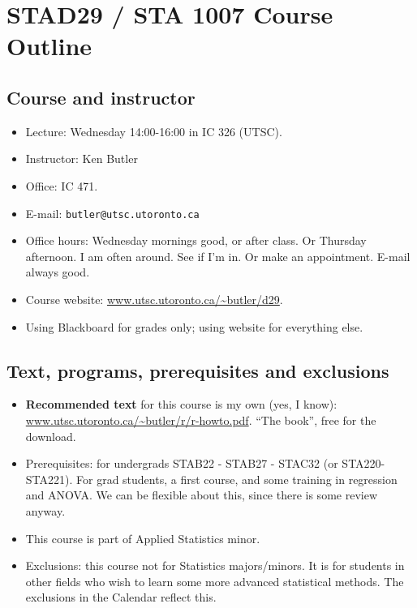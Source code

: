 \documentclass{article}
\begin{document}
\section*{STAD29 / STA 1007 Course Outline}

\subsection*{Course and instructor}
\begin{itemize}
    \item  Lecture: Wednesday 14:00-16:00 in IC 326 (UTSC).
    \item  Instructor: Ken Butler
    \item  Office: IC 471.
    \item  E-mail: \verb-butler@utsc.utoronto.ca-
    \item Office hours: Wednesday mornings good, or after
      class. Or Thursday afternoon. I am often around. See if I'm in. Or make an
      appointment. E-mail always good.
    \item Course website: 
\url{www.utsc.utoronto.ca/~butler/d29}.
    \item Using Blackboard for grades only; using website for
      everything else.
\end{itemize}



\subsection*{Text, programs, prerequisites and exclusions}

\begin{itemize}
    \item {\bf Recommended text} for this course is my own (yes, I
      know):
      \url{www.utsc.utoronto.ca/~butler/r/r-howto.pdf}.
      ``The book'', free for the download.

    \item Prerequisites: for undergrads STAB22 - STAB27 - STAC32
      (or STA220-STA221). For grad students,
      a first course, and some training in
      regression and ANOVA. We can be flexible about this, since there
      is some review anyway.
    \item This course is part of Applied Statistics minor.
    \item Exclusions: this course not for Statistics majors/minors. It
      is for
      students in other fields who wish to learn some more advanced
      statistical methods. The exclusions in the Calendar reflect
      this. 
\end{itemize}
  
\end{document}
